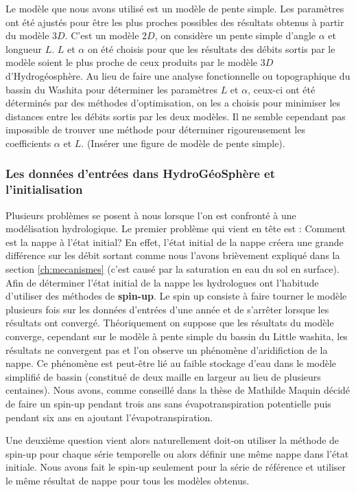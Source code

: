 \documentclass[a4paper,11pt]{article}
\begin{document}
Le modèle que nous avons utilisé est un modèle de pente simple. Les paramètres ont été ajustés pour être les plus proches possibles des résultats obtenus à partir du modèle $3D$. C'est un modèle $2D$, on considère un pente simple d'angle $\alpha$ et longueur $L$. $L$ et $\alpha$ on été choisis pour que les résultats des débits sortis par le modèle soient le plus proche de ceux produits par le modèle $3D$ d'Hydrogéosphère. Au lieu de faire une analyse fonctionnelle ou topographique du bassin du Washita pour déterminer les paramètres $L$ et $\alpha$, ceux-ci ont été déterminés par des méthodes d'optimisation, on les a choisis pour minimiser les distances entre les débits sortis par les deux modèles. Il ne semble cependant pas impossible de trouver une méthode pour déterminer rigoureusement les coefficients $\alpha$ et $L$. (Insérer une figure de modèle de pente simple).     

\subsubsection{Les données d'entrées dans HydroGéoSphère et l'initialisation}

Plusieurs problèmes se posent à nous lorsque l'on est confronté à une modélisation hydrologique. Le premier problème qui vient en tête est : Comment est la nappe à l'état initial? En effet, l'état initial de la nappe créera une grande différence sur les débit sortant comme nous l'avons brièvement expliqué dans la section \ref{ch:mecanismes} (c'est causé par la saturation en eau du sol en surface). Afin de déterminer l'état initial de la nappe les hydrologues ont l'habitude d'utiliser des méthodes de \textbf{spin-up}. Le spin up consiste à faire tourner le modèle plusieurs fois sur les données d'entrées d'une année et de s'arrêter lorsque les résultats ont convergé. Théoriquement on suppose que les résultats du modèle converge, cependant sur le modèle à pente simple du bassin du Little washita, les résultats ne convergent pas et l'on observe un phénomène d'aridifiction de la nappe. Ce phénomène est peut-être lié au faible stockage d'eau dans le modèle simplifié de bassin (constitué de deux maille en largeur au lieu de plusieurs centaines). Nous avons, comme conseillé dans la thèse de Mathilde Maquin décidé de faire un spin-up pendant trois ans sans évapotranspiration potentielle puis pendant six ans en ajoutant l'évapotranspiration. 

Une deuxième question vient alors naturellement doit-on utiliser la méthode de spin-up pour chaque série temporelle ou alors définir une même nappe dans l'état initiale. Nous avons fait le spin-up seulement pour la série de référence et utiliser le même résultat de nappe pour tous les modèles obtenus. 
\end{document}

